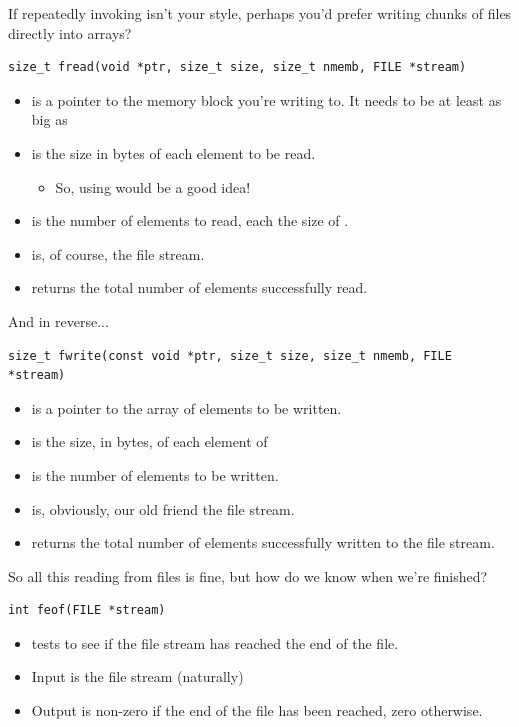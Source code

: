 \documentclass[11pt]{beamer}
\let\OldTexttt\texttt
\renewcommand{\texttt}[1]{\OldTexttt{\color{teal}{#1}}}
\begin{document}
\begin{frame}[fragile=singleslide]{\texttt{fread()}}
If repeatedly invoking \texttt{fscanf()} isn't your style, perhaps you'd prefer writing chunks of files directly into arrays?
\begin{lstlisting}[style=C]
size_t fread(void *ptr, size_t size, size_t nmemb, FILE *stream)
\end{lstlisting}
\begin{itemize}
\item \texttt{ptr} is a pointer to the memory block you're writing to.  It needs to be at least as big as \texttt{size*nmemb}
\item \texttt{size} is the size in bytes of each element to be read.  
\begin{itemize}
\item So, using \texttt{sizeof()} would be a good idea!
\end{itemize}
\item \texttt{nmemb} is the number of elements to read, each the size of \texttt{size}.
\item \texttt{stream} is, of course, the file stream.
\item \texttt{fread()} returns the total number of elements successfully read.
\end{itemize}
\end{frame}


\begin{frame}[fragile=singleslide]{\texttt{fwrite()}}
And in reverse...
\begin{lstlisting}[style=C]
size_t fwrite(const void *ptr, size_t size, size_t nmemb, FILE *stream)
\end{lstlisting}
\begin{itemize}
\item \texttt{ptr} is a pointer to the array of elements to be written.
\item \texttt{size} is the size, in bytes, of each element of \texttt{ptr}
\item \texttt{nmemb} is the number of elements to be written.
\item \texttt{stream} is, obviously, our old friend the file stream.  
\item \texttt{fwrite()} returns the total number of elements successfully written to the file stream.  
\end{itemize}
\end{frame}


\begin{frame}[fragile=singleslide]{\texttt{feof()}}
So all this reading from files is fine, but how do we know when we're finished? 
\begin{lstlisting}[style=C]
int feof(FILE *stream)
\end{lstlisting}
\begin{itemize}
\item \texttt{feof()} tests to see if the file stream has reached the end of the file.
\item Input is the file stream (naturally)
\item Output is non-zero if the end of the file has been reached, zero otherwise.  
\end{itemize}
\end{frame}
\end{document}
